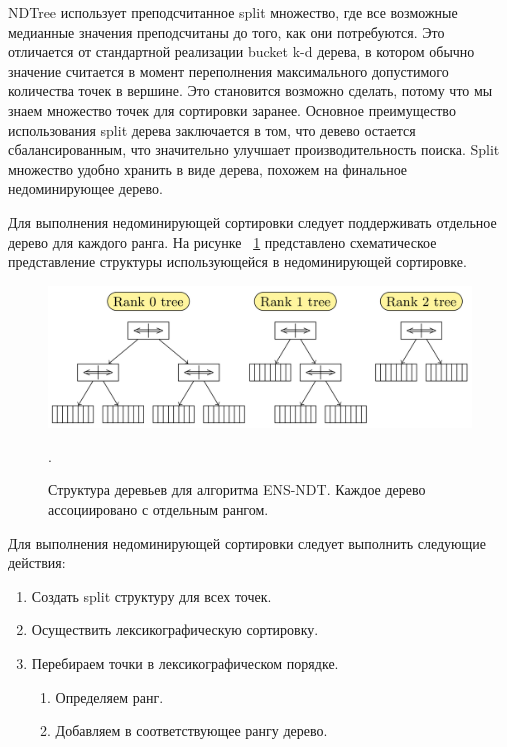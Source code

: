 NDTree использует преподсчитанное split множество, где все возможные медианные значения преподсчитаны до того, как они потребуются. Это отличается от стандартной реализации bucket k-d дерева, в котором обычно значение считается в момент переполнения максимального допустимого количества точек в вершине. Это становится возможно сделать, потому что мы знаем множество точек для сортировки заранее. Основное преимущество использования split дерева заключается в том, что девево остается сбалансированным, что значительно улучшает производительность поиска. Split множество удобно хранить в виде дерева, похожем на финальное недоминирующее дерево.

Для выполнения недоминирующей сортировки следует поддерживать отдельное дерево для каждого ранга. На рисунке ~\ref{ndtree_original} представлено схематическое представление структуры использующейся в недоминирующей сортировке.

\begin{figure}[!h]
\begin{center}
\includegraphics[width=15cm]{pic/ndtree_original.png}
\caption{Структура деревьев для алгоритма ENS-NDT. Каждое дерево ассоциировано с отдельным рангом.}.
\label{ndtree_original}
\end{center}
\end{figure}

Для выполнения недоминирующей сортировки следует выполнить следующие действия:
\begin{enumerate}
\item Создать split структуру для всех точек.
\item Осуществить лексикографическую сортировку.
\item Перебираем точки в лексикографическом порядке.
    \begin{enumerate}
    \item Определяем ранг.
    \item Добавляем в соответствующее рангу дерево.
    \end{enumerate}
\end{enumerate}

